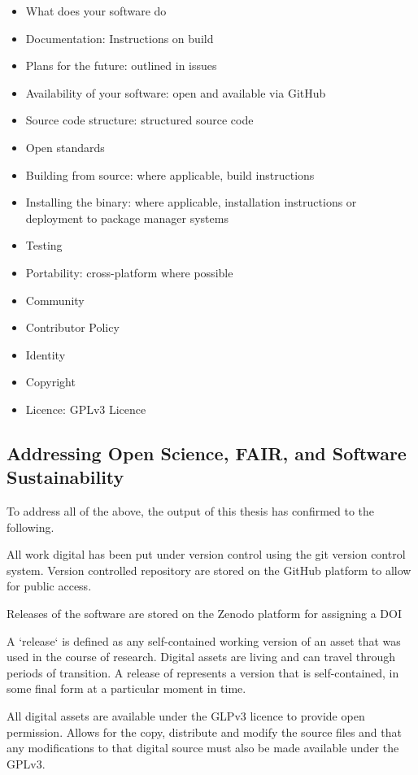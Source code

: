 \begin{itemize}
\item What does your software do
\item Documentation: Instructions on build
\item Plans for the future: outlined in issues
\item Availability of your software: open and available via GitHub
\item Source code structure: structured source code
\item Open standards
\item Building from source: where applicable, build instructions
\item Installing the binary: where applicable, installation instructions or deployment to package manager systems
\item Testing
\item Portability: cross-platform where possible
\item Community
\item Contributor Policy
\item Identity
\item Copyright
\item Licence: GPLv3 Licence
\end{itemize}


\subsection{Addressing Open Science, FAIR, and Software Sustainability}

To address all of the above, the output of this thesis has confirmed to the following. 

All work digital has been put under version control using the git version control system. Version controlled repository are stored on the GitHub platform to allow for public access.

Releases of the software are stored on the Zenodo platform for assigning a DOI

A `release` is defined as any self-contained working version of an asset that was used in the course of research. Digital assets are living and can travel through periods of transition. A release of represents a version that is self-contained, in some final form at a particular moment in time.

All digital assets are available under the GLPv3 licence to provide open permission. Allows for the copy, distribute and modify the source files and that any modifications to that digital source must also be made available under the GPLv3.

